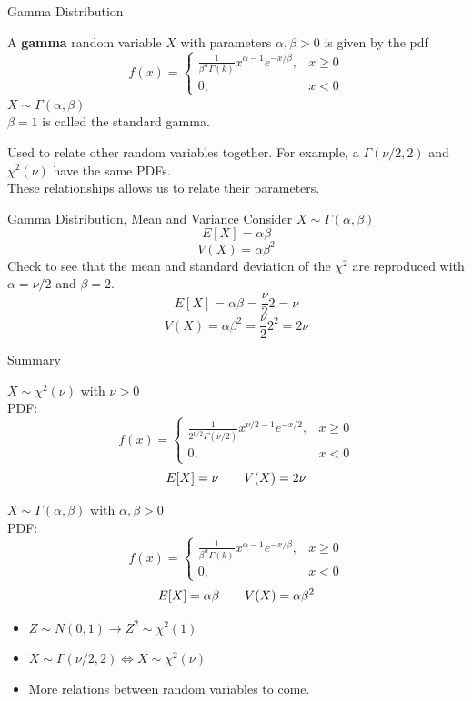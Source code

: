 \documentclass[]{beamer}
\newcommand{\nl}[1]{\vspace{#1 em}}
\begin{document}
\begin{frame}{Gamma Distribution}
    \begin{block}{}
        A \textbf{gamma} random variable $X$ with parameters $\alpha,\beta>0$ is given by the pdf
        $$f(x) = \begin{cases}\frac{1}{\beta^\alpha\Gamma(k)}x^{\alpha-1}e^{-x/\beta}, & x\geq 0 \\ 0, & x<0\end{cases}$$
        $X\sim \Gamma(\alpha,\beta)$ \\ \nl{0.5}
        $\beta=1$ is called the standard gamma.
    \end{block}
    Used to relate other random variables together. For example, a $\Gamma(\nu/2,2)$ and $\chi^2(\nu)$ have the same PDFs.
    \\ \nl{0.5}
    These relationships allows us to relate their parameters.
\end{frame}
\begin{frame}{Gamma Distribution, Mean and Variance}
Consider $X \sim \Gamma(\alpha,\beta)$
$$ E[X] = \alpha\beta $$
$$ V(X) = \alpha\beta^2 $$
\pause Check to see that the mean and standard deviation of the $\chi^2$ are reproduced with $\alpha=\nu/2$ and $\beta = 2$.
\pause $$E[X] = \alpha\beta = \frac{\nu}{2} 2 = \nu$$
\pause $$ V(X) = \alpha\beta^2 = \frac{\nu}{2} 2^2 = 2 \nu$$
\vfill
\end{frame}
\begin{frame}{Summary}
    \begin{block}{}
        $X \sim \chi^2(\nu)$ with $\nu>0$\\
        PDF:
    $$f(x) = \begin{cases}\frac1{2^{\nu/2}\Gamma(\nu/2)}x^{\nu/2-1}e^{-x/2},& x\geq 0 \\ 0, & x<0\end{cases}$$
        $$ E[X]  = \nu \hskip 2em V(X) = 2\nu $$
    \end{block}
    \begin{block}{}
        $X \sim \Gamma(\alpha,\beta)$ with $\alpha,\beta>0$\\
        PDF:
    $$f(x) = \begin{cases}\frac{1}{\beta^\alpha\Gamma(k)}x^{\alpha-1}e^{-x/\beta}, & x\geq 0 \\ 0, & x<0\end{cases}$$
        $$ E[X]  = \alpha\beta \hskip 2em V(X) = \alpha\beta^2 $$
    \end{block}
    \begin{itemize}
        \item $Z\sim N(0,1) \to Z^2 \sim \chi^2(1)$
        \item $X\sim \Gamma(\nu/2,2)  \iff X \sim \chi^2(\nu)$
        \item More relations between random variables to come.
    \end{itemize}
\end{frame}
\end{document}
